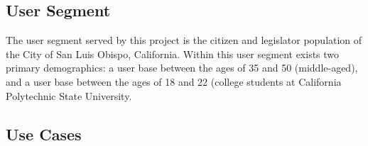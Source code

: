 
\subsection{User Segment}
The user segment served by this project is the citizen and legislator population of
the City of San Luis Obispo, California. Within this user segment
exists two primary demographics: a user base between the ages of 35 and 50
(middle-aged), and a user base between the ages of 18 and 22 (college students
at California Polytechnic State University.
\subsection{Use Cases}



